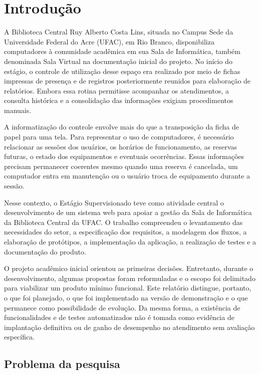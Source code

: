 \chapter{Introdução}\label{cap:introducao}

A Biblioteca Central Ruy Alberto Costa Lins, situada no Campus Sede da Universidade Federal do Acre (UFAC), em Rio Branco, disponibiliza computadores à comunidade acadêmica em sua Sala de Informática, também denominada Sala Virtual na documentação inicial do projeto. No início do estágio, o controle de utilização desse espaço era realizado por meio de fichas impressas de presença e de registros posteriormente reunidos para elaboração de relatórios. Embora essa rotina permitisse acompanhar os atendimentos, a consulta histórica e a consolidação das informações exigiam procedimentos manuais.

A informatização do controle envolve mais do que a transposição da ficha de papel para uma tela. Para representar o uso de computadores, é necessário relacionar as sessões dos usuários, os horários de funcionamento, as reservas futuras, o estado dos equipamentos e eventuais ocorrências. Essas informações precisam permanecer coerentes mesmo quando uma reserva é cancelada, um computador entra em manutenção ou o usuário troca de equipamento durante a sessão.

Nesse contexto, o Estágio Supervisionado teve como atividade central o desenvolvimento de um sistema web para apoiar a gestão da Sala de Informática da Biblioteca Central da UFAC. O trabalho compreendeu o levantamento das necessidades do setor, a especificação dos requisitos, a modelagem dos fluxos, a elaboração de protótipos, a implementação da aplicação, a realização de testes e a documentação do produto.

O projeto acadêmico inicial orientou as primeiras decisões. Entretanto, durante o desenvolvimento, algumas propostas foram reformuladas e o escopo foi delimitado para viabilizar um produto mínimo funcional. Este relatório distingue, portanto, o que foi planejado, o que foi implementado na versão de demonstração e o que permanece como possibilidade de evolução. Da mesma forma, a existência de funcionalidades e de testes automatizados não é tomada como evidência de implantação definitiva ou de ganho de desempenho no atendimento sem avaliação específica.

\section{Problema da pesquisa}\label{sec:problema}

